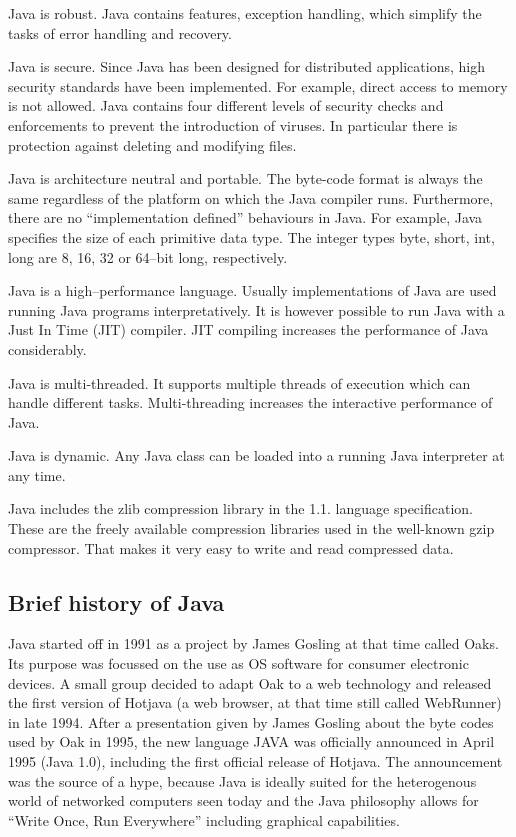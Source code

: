 Java is robust. Java contains features, exception handling, which simplify the
tasks of error handling and recovery.

Java is secure. Since Java has been designed for distributed applications, 
high security standards have been implemented. For example, direct access to
memory is not allowed. Java contains four different levels of security 
checks and enforcements to prevent the introduction of viruses. 
In particular there is protection against deleting and modifying files.

Java is architecture neutral and portable. The byte-code format is always the 
same regardless of the platform on which the Java compiler runs. Furthermore,
there are no ``implementation defined'' behaviours in Java. For example, Java
specifies the size of each primitive data type. The integer 
types byte, short, int, long are 8, 16, 32 or 64--bit long, respectively.

Java is a high--performance language. 
Usually implementations of Java are used running 
Java programs interpretatively. It is however possible to run Java with a 
Just In Time (JIT) compiler. JIT compiling increases the performance of Java 
considerably.

Java is multi-threaded. It supports multiple threads of execution which can 
handle different tasks. Multi-threading increases the interactive performance 
of Java.

Java is dynamic. Any Java class can be loaded into a running Java interpreter 
at any time.

Java includes the zlib compression library in the 1.1. language specification.
These are
the freely available compression libraries used in the well-known
gzip compressor.
That makes it very easy to write and read compressed data. 


\subsection{Brief history of Java}
Java started off in 1991 as a project by James Gosling at that time called
Oaks. Its purpose was focussed on the use as OS software for consumer
electronic devices. A small group decided to adapt Oak to a web
technology and released the first version of Hotjava (a web browser, at that
time still called WebRunner)
in late 1994. After a presentation given by James Gosling about the 
byte codes used by Oak in 1995, the new language JAVA was officially 
announced in April 1995 (Java 1.0), 
including the first official release of Hotjava.
The announcement was the source of a hype, because Java is ideally
suited for the heterogenous world of networked computers seen today and
the Java philosophy allows for ``Write Once, Run Everywhere'' including
graphical capabilities.

